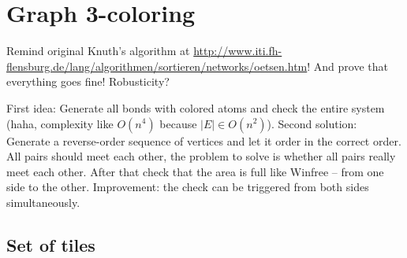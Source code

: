 \section{Graph 3-coloring}

Remind original Knuth's algorithm at \url{http://www.iti.fh-flensburg.de/lang/algorithmen/sortieren/networks/oetsen.htm}! And prove that everything goes fine! Robusticity?

First idea: Generate all bonds with colored atoms and check the entire system (haha, complexity like $O(n^4)$ because $|E| \in O(n^2) $). Second solution: Generate a reverse-order sequence of vertices and let it order in the correct order. All pairs should meet each other, the problem to solve is whether all pairs really meet each other. After that check that the area is full like Winfree -- from one side to the other. Improvement: the check can be triggered from both sides simultaneously.

\subsection*{Set of tiles}

